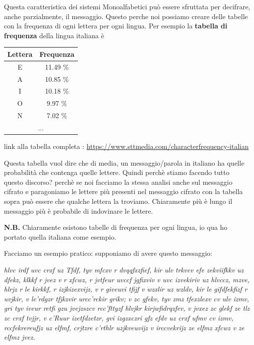 \documentclass{report}
\begin{document}
\vspace{0.2cm}
Questa caratteristica dei sistemi Monoalfabetici può essere sfruttata per decifrare, anche parzialmente, il messaggio. Questo perche noi possiamo creare delle tabelle con la frequenza di ogni lettera per ogni lingua. Per esempio la \textbf{tabella di frequenza} della lingua italiana è 

\begin{table}[h]
\centering
    \begin{tabular}{cc}
\multicolumn{1}{c|}{Lettera} & Frequenza \\ \hline
\multicolumn{1}{c|}{E}       & 11.49 \%  \\
\multicolumn{1}{c|}{A}       & 10.85 \%  \\
\multicolumn{1}{c|}{I}       & 10.18 \%  \\
\multicolumn{1}{c|}{O}       & 9.97 \%   \\
\multicolumn{1}{c|}{N}       & 7.02 \%   \\
\multicolumn{2}{c}{...}                 
\end{tabular}
\end{table}

\begin{center}
    
link alla tabella completa : \href{https://www.sttmedia.com/characterfrequency-italian}{https://www.sttmedia.com/characterfrequency-italian}
\end{center}

Questa tabella vuol dire che di media, un messaggio/parola in italiano ha quelle probabilità che contenga quelle lettere. Quindi perchè stiamo facendo tutto questo discorso? perchè se noi facciamo la stessa analisi anche sul messaggio cifrato e paragoniamo le lettere più presenti nel messaggio cifrato con la tabella sopra può essere che qualche lettera la troviamo. Chiaramente più è lungo il messaggio più è probabile di indovinare le lettere. 

\textbf{N.B.} Chiaramente esistono tabelle di frequenza per ogni lingua, io qua ho portato quella italiana come esempio.

\newpage

Facciamo un esempio pratico: supponiamo di avere questo messaggio:
\vspace{0.2cm}

\textit{hlvc irdf uvc crxf uz Tfdf, tyv mfcxv r dvqqfxzfief, kir ulv trkvev efe zekviifkkv uz dfekz, klkkf r jvez v r xfcwz, r jvtfeur uvccf jgfixviv v uvc izvekiriv uz hlvccz, mzve, hlrjz r le kirkkf, r izjkizexvijz, v r giveuvi tfijf v wzxlir uz wzldv, kir le gifdfekfizf r uvjkir, v le’rdgzr tfjkzvir urcc’rckir grikv; v zc gfekv, tyv zmz tfexzlexv cv ulv izmv, gri tyv iveur retfi gzu jvejzszcv rcc’fttyzf hlvjkr kirjwfidrqzfev, v jvxez zc glekf ze tlz zc crxf tvjjr, v c’Ruur izetfdzetzr, gvi izgzxczri gfz efdv uz crxf ufmv cv izmv, rccfekrereufjz uz elfmf, crjtzre c’rthlr uzjkveuvijz v irccvekrijz ze elfmz xfcwz v ze elfmz jvez. }
\vspace{0.2cm}
\end{document}
